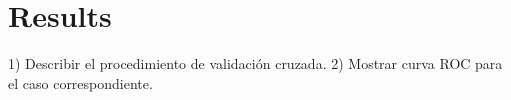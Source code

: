 \section{Results}

1) Describir el procedimiento de validación cruzada. 
2) Mostrar curva ROC para el caso correspondiente.

